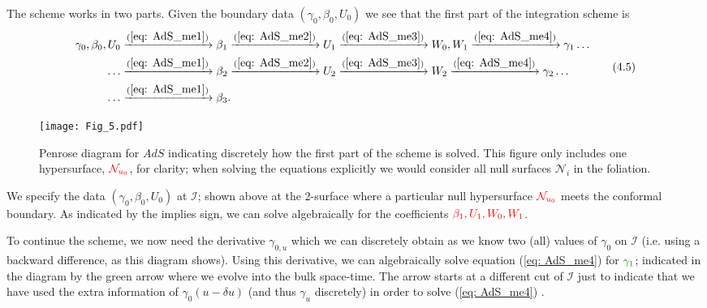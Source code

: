 \documentclass[a4paper,11pt]{article}
\numberwithin{equation}{section}
\begin{document}

The scheme works in two parts. Given the boundary data $(\gamma_0, \beta_0, U_0)$ we see that the first part of the integration scheme is 
\begin{align} 
\begin{split}
\gamma_0, \beta_0, U_0 & \xrightarrow{(\ref{eq: AdS_me1}) } \beta_1  \xrightarrow{(\ref{eq: AdS_me2}) } U_1 \xrightarrow{(\ref{eq: AdS_me3}) } W_0, W_1 \xrightarrow{(\ref{eq: AdS_me4}) } \gamma_1 \ldots \\
\ldots & \xrightarrow{(\ref{eq: AdS_me1}) } \beta_2 \xrightarrow{(\ref{eq: AdS_me2}) } U_2 \xrightarrow{(\ref{eq: AdS_me3}) } W_2 \xrightarrow{(\ref{eq: AdS_me4}) } \gamma_2 \ldots \\
\ldots & \xrightarrow{(\ref{eq: AdS_me1}) } \beta_3.
\end{split}
\tag{4.5}
\end{align}

\begin{figure}[H]
\begin{center}
\texttt{[image: Fig\_5.pdf]}
\end{center}
\caption{Penrose diagram for $AdS$ indicating discretely how the first part of the scheme is solved. This figure only includes one hypersurface, $\color{red}{\mathcal{N}_{u_0}}$, for clarity; when solving the equations explicitly we would consider all null surfaces $\mathcal{N}_i$ in the foliation.}
\end{figure}
 
We specify the data $(\gamma_0, \beta_0, U_0)$ at $\mathscr{I}$; shown above at the 2-surface where a particular null hypersurface $\color{red}{\mathcal{N}_{u_0}}$ meets the conformal boundary. As indicated by the implies sign, we can solve algebraically for the coefficients $\color{red}{\beta_1, U_1, W_0, W_1}$. \par 

 To continue the scheme, we now need the derivative $\gamma_{0,u}$ which we can discretely obtain as we know two (all) values of $\gamma_0$ on $\mathscr{I}$ (i.e. using a backward difference, as this diagram shows). Using this derivative, we can algebraically solve equation (\ref{eq: AdS_me4})  for $\color{islamicgreen}{\gamma_1}$; indicated in the diagram by the \textcolor{islamicgreen}{green} arrow where we evolve into the bulk space-time. The arrow starts at a different cut of $\mathscr{I}$ just to indicate that we have used the extra information of $\gamma_0(u-\delta u)$ (and thus $\gamma_u$ discretely) in order to solve (\ref{eq: AdS_me4}) . \par
 
\end{document}
